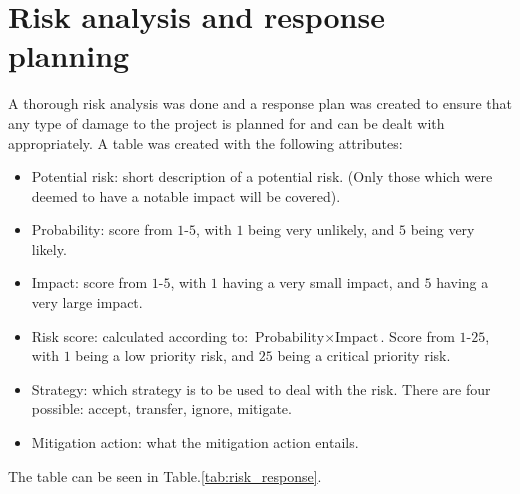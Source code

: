\section{Risk analysis and response planning}
\label{section:risk_analysis_and_response_planning}

A thorough risk analysis was done and a response plan was created to ensure that any type of damage to the project is planned for and can be dealt with appropriately.
A table was created with the following attributes:
\begin{itemize}
    \item Potential risk: short description of a potential risk. (Only those which were deemed to have a notable impact will be covered).
    \item Probability: score from $1\text{-}5$, with $1$ being very unlikely, and $5$ being very likely.
    \item Impact: score from $1\text{-}5$, with $1$ having a very small impact, and $5$ having a very large impact.
    \item Risk score: calculated according to: $\text{Probability} \times \text{Impact}$. Score from $1\text{-}25$, with $1$ being a low priority risk, and $25$ being a critical priority risk.
    \item Strategy: which strategy is to be used to deal with the risk. There are four possible: accept, transfer, ignore, mitigate.
    \item Mitigation action: what the mitigation action entails.
\end{itemize}
The table can be seen in Table.\:\ref{tab:risk_response}.

